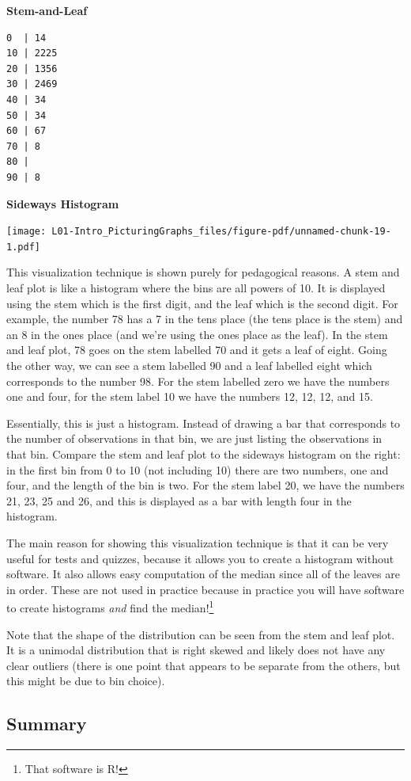 \documentclass[
  letterpaper,
  DIV=11,
  numbers=noendperiod,
  oneside]{scrreprt}
\begin{document}
\textbf{Stem-and-Leaf}

\begin{verbatim}
0  | 14
10 | 2225
20 | 1356
30 | 2469
40 | 34
50 | 34
60 | 67
70 | 8
80 |
90 | 8
\end{verbatim}

\textbf{Sideways Histogram}

\texttt{[image: L01-Intro\_PicturingGraphs\_files/figure-pdf/unnamed-chunk-19-1.pdf]}

This visualization technique is shown purely for pedagogical reasons. A
stem and leaf plot is like a histogram where the bins are all powers of
10. It is displayed using the stem which is the first digit, and the
leaf which is the second digit. For example, the number 78 has a 7 in
the tens place (the tens place is the stem) and an 8 in the ones place
(and we're using the ones place as the leaf). In the stem and leaf plot,
78 goes on the stem labelled 70 and it gets a leaf of eight. Going the
other way, we can see a stem labelled 90 and a leaf labelled eight which
corresponds to the number 98. For the stem labelled zero we have the
numbers one and four, for the stem label 10 we have the numbers 12, 12,
12, and 15.

Essentially, this is just a histogram. Instead of drawing a bar that
corresponds to the number of observations in that bin, we are just
listing the observations in that bin. Compare the stem and leaf plot to
the sideways histogram on the right: in the first bin from 0 to 10 (not
including 10) there are two numbers, one and four, and the length of the
bin is two. For the stem label 20, we have the numbers 21, 23, 25 and
26, and this is displayed as a bar with length four in the histogram.

The main reason for showing this visualization technique is that it can
be very useful for tests and quizzes, because it allows you to create a
histogram without software. It also allows easy computation of the
median since all of the leaves are in order. These are not used in
practice because in practice you will have software to create histograms
\emph{and} find the median!\footnote{That software is R!}

Note that the shape of the distribution can be seen from the stem and
leaf plot. It is a unimodal distribution that is right skewed and likely
does not have any clear outliers (there is one point that appears to be
separate from the others, but this might be due to bin choice).

\hypertarget{summary}{%
\subsection{Summary}\label{summary}}
\end{document}
